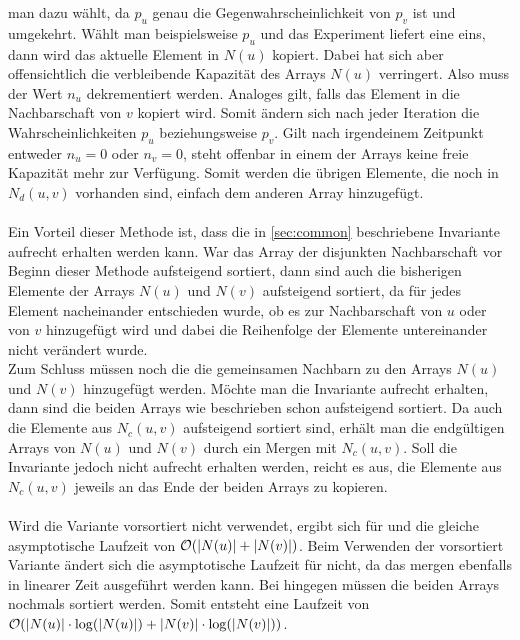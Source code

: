 man dazu wählt, da $p_u$ genau die Gegenwahrscheinlichkeit von $p_v$ ist und umgekehrt. 
Wählt man beispielsweise $p_u$ und das Experiment liefert eine eins, dann wird das aktuelle Element
in $N(u)$ kopiert. Dabei
hat sich aber offensichtlich die verbleibende Kapazität des Arrays $N(u)$ verringert. Also muss
der Wert $n_u$ dekrementiert werden. Analoges gilt, falls das Element in die Nachbarschaft von $v$ kopiert wird.
Somit ändern sich nach jeder Iteration die Wahrscheinlichkeiten $p_u$ beziehungsweise $p_v$.
Gilt nach irgendeinem Zeitpunkt entweder $n_u = 0$ oder $n_v = 0$, steht offenbar in einem der Arrays 
keine freie Kapazität mehr zur Verfügung. Somit werden die übrigen Elemente, die noch in $N_{d}(u,v)$ vorhanden sind, 
einfach dem anderen Array hinzugefügt.
\\
\\
Ein Vorteil dieser Methode ist, dass die in \ref{sec:common} beschriebene Invariante aufrecht erhalten werden kann.
War das Array der disjunkten Nachbarschaft vor Beginn dieser Methode aufsteigend sortiert,
dann sind auch die bisherigen Elemente der Arrays $N(u)$ und $N(v)$ aufsteigend sortiert, da für jedes
Element nacheinander entschieden wurde, ob es zur Nachbarschaft von $u$ oder von $v$ hinzugefügt wird und dabei die
Reihenfolge der Elemente untereinander nicht verändert wurde.
\\
Zum Schluss müssen noch die die gemeinsamen Nachbarn zu den Arrays $N(u)$ und $N(v)$ hinzugefügt werden.
Möchte man die Invariante aufrecht erhalten, dann sind die beiden Arrays wie beschrieben schon
aufsteigend sortiert. Da auch die Elemente aus $N_{c}(u,v)$ aufsteigend sortiert sind, erhält man
die endgültigen Arrays von $N(u)$ und $N(v)$ durch ein Mergen mit $N_{c}(u,v)$. Soll die Invariante jedoch
nicht aufrecht erhalten werden, reicht es aus, die Elemente aus $N_{c}(u,v)$ jeweils an das Ende der beiden Arrays
zu kopieren.
\\
\\
Wird die Variante vorsortiert nicht verwendet, ergibt sich für \perm{} und \distr{}
die gleiche asymptotische Laufzeit von $\mathcal{O}(|N(u)| + |N(v)|)$. 
Beim Verwenden der vorsortiert Variante ändert sich die asymptotische Laufzeit für \distr{}
nicht, da das mergen ebenfalls in linearer Zeit ausgeführt werden kann. Bei \perm{}
hingegen müssen die beiden Arrays nochmals sortiert werden. Somit entsteht
eine Laufzeit von $\mathcal{O}(|N(u)| \cdot \log(|N(u)|) + |N(v)| \cdot \log(|N(v)|))$.


